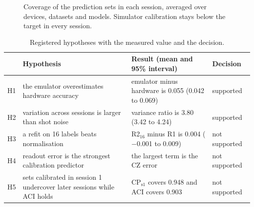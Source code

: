\documentclass[10pt,conference]{IEEEtran}
\begin{document}
\begin{figure}[t]
\centering
{}
\caption{Coverage of the prediction sets in each session, averaged over devices, datasets and
models. Simulator calibration stays below the target in every session.}
\label{fig:coverage}
\end{figure}

\begin{table}[t]
\centering
\caption{Registered hypotheses with the measured value and the decision.}
\label{tab:hypotheses}
\footnotesize
\renewcommand{\arraystretch}{1.15}
\begin{tabular}{lL{6.2cm}L{6.4cm}l}
\toprule
 & Hypothesis & Result (mean and 95\% interval) & Decision \\
\midrule
H1 & the emulator overestimates hardware accuracy & emulator minus hardware is 0.055 (0.042 to 0.069) & supported \\
H2 & variation across sessions is larger than shot noise & variance ratio is 3.80 (3.42 to 4.24) & supported \\
H3 & a refit on 16 labels beats normalisation & R2$_{16}$ minus R1 is 0.004 ($-$0.001 to 0.009) & not supported \\
H4 & readout error is the strongest calibration predictor & the largest term is the CZ error & not supported \\
H5 & sets calibrated in session 1 undercover later sessions while ACI holds & CP$_\mathrm{s1}$ covers 0.948 and ACI covers 0.903 & not supported \\
\bottomrule
\end{tabular}
\end{table}
\end{document}
